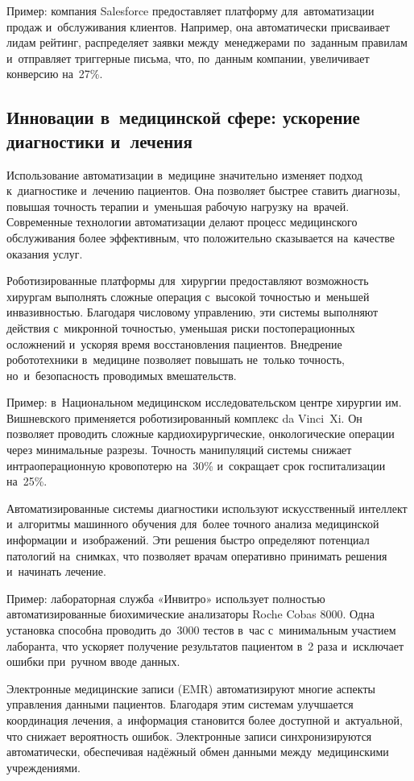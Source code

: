 \documentclass{ou}
\begin{document}
Пример: компания Salesforce предоставляет платформу для~автоматизации продаж и~обслуживания клиентов. Например, она автоматически присваивает лидам рейтинг, распределяет заявки между~менеджерами по~заданным правилам и~отправляет триггерные письма, что, по~данным компании, увеличивает конверсию на~27\%.
\subsection{Инновации в~медицинской сфере: ускорение диагностики и~лечения}
Использование автоматизации в~медицине значительно изменяет подход к~диагностике и~лечению пациентов. Она позволяет быстрее ставить диагнозы, повышая точность терапии и~уменьшая рабочую нагрузку на~врачей. Современные технологии автоматизации делают процесс медицинского обслуживания более эффективным, что положительно сказывается на~качестве оказания услуг.

Роботизированные платформы для~хирургии предоставляют возможность хирургам выполнять сложные операция с~высокой точностью и~меньшей инвазивностью. Благодаря числовому управлению, эти системы выполняют действия с~микронной точностью, уменьшая риски постоперационных осложнений и~ускоряя время восстановления пациентов. Внедрение робототехники в~медицине позволяет повышать не~только точность, но~и~безопасность проводимых вмешательств.

Пример: в~Национальном медицинском исследовательском центре хирургии им. Вишневского применяется роботизированный комплекс da Vinci~Xi. Он позволяет проводить сложные кардиохирургические, онкологические операции через минимальные разрезы. Точность манипуляций системы снижает интраоперационную кровопотерю на~30\% и~сокращает срок госпитализации на~25\%.

Автоматизированные системы диагностики используют искусственный интеллект и~алгоритмы машинного обучения для~более точного анализа медицинской информации и~изображений. Эти решения быстро определяют потенциал патологий на~снимках, что позволяет врачам оперативно принимать решения и~начинать лечение.

Пример: лабораторная служба «Инвитро» использует полностью автоматизированные биохимические анализаторы Roche Cobas 8000. Одна установка способна проводить до~3000 тестов в~час с~минимальным участием лаборанта, что ускоряет получение результатов пациентом в~2 раза и~исключает ошибки при~ручном вводе данных.

Электронные медицинские записи (EMR) автоматизируют многие аспекты управления данными пациентов. Благодаря этим системам улучшается координация лечения, а~информация становится более доступной и~актуальной, что снижает вероятность ошибок. Электронные записи синхронизируются автоматически, обеспечивая надёжный обмен данными между~медицинскими учреждениями.
\end{document}
